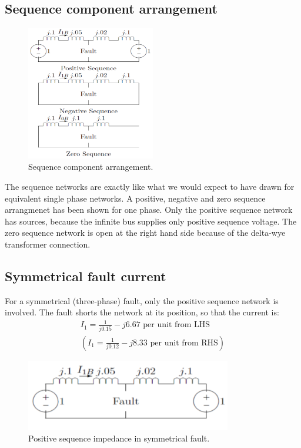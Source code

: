 \documentclass[class=report, crop=false, 12pt,a4paper]{standalone}
\begin{document}
\subsection{Sequence component arrangement}
\begin{figure}[H]
	\centering
	\includegraphics[width = 0.5\textwidth]{../img/figure40.png}
	\caption{Sequence component arrangement.}
\end{figure}
The sequence networks are exactly like what we would expect to have drawn for equivalent single phase networks. A positive, negative and zero sequence arrangmenet has been shown for one phase. Only the positive sequence network has sources, because the infinite bus supplies only positive sequence voltage. The zero sequence network is open at the right hand side because of the delta-wye transformer connection.
\subsection{Symmetrical fault current}
For a symmetrical (three-phase) fault, only the positive sequence network is involved. The fault shorts the network at its position, so that the current is:
\begin{gather}
	I_1 = \frac{1}{j0.15} - j6.67 \textrm{ per unit from LHS}\\
	(I_1 = \frac{1}{j0.12} - j8.33 \textrm{ per unit from RHS})
\end{gather}
\begin{figure}[H]
	\centering
	\includegraphics[width = 0.8\textwidth]{../img/figure41.png}
	\caption{Positive sequence impedance in symmetrical fault.}
\end{figure}
\end{document}

